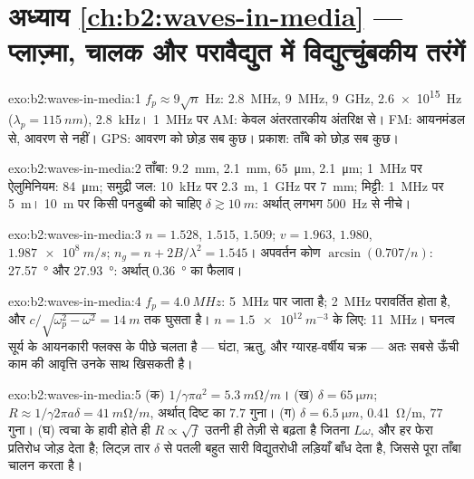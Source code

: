 \section*{अध्याय \ref{ch:b2:waves-in-media} --- प्लाज़्मा, चालक और परावैद्युत में विद्युत्चुंबकीय तरंगें}

\begin{solution}{exo:b2:waves-in-media:1}
$f_p \approx 9\sqrt n$ Hz: \qty{2.8}{MHz}, \qty{9}{MHz}, \qty{9}{GHz}, \qty{2.6e15}{Hz}
($\lambda_p = \qty{115}{nm}$), \qty{2.8}{kHz}। \qty{1}{MHz} पर AM: केवल
अंतरतारकीय अंतरिक्ष से। FM: आयनमंडल से, आवरण से नहीं। GPS:
आवरण को छोड़ सब कुछ। प्रकाश: ताँबे को छोड़ सब कुछ।
\end{solution}

\begin{solution}{exo:b2:waves-in-media:2}
ताँबा: \qty{9.2}{mm}, \qty{2.1}{mm}, \qty{65}{\micro m}, \qty{2.1}{\micro m}; \qty{1}{MHz} पर
ऐलुमिनियम: \qty{84}{\micro m}; समुद्री जल: \qty{10}{kHz} पर \qty{2.3}{m}, \qty{1}{GHz} पर
\qty{7}{mm}; मिट्टी: \qty{1}{MHz} पर \qty{5}{m}। \qty{10}{m} पर किसी पनडुब्बी को चाहिए $\delta
\gtrsim \qty{10}{m}$: अर्थात् लगभग \qty{500}{Hz} से नीचे।
\end{solution}

\begin{solution}{exo:b2:waves-in-media:3}
$n = 1.528$, $1.515$, $1.509$; $v = 1.963$, $1.980$, $\qty{1.987e8}{m/s}$; $n_g = n +
2B/\lambda^2 = 1.545$। अपवर्तन कोण $\arcsin(0.707/n)$: \qty{27.57}{\degree} और
\qty{27.93}{\degree}: अर्थात् \qty{0.36}{\degree} का फैलाव।
\end{solution}

\begin{solution}{exo:b2:waves-in-media:4}
$f_p = \qty{4.0}{MHz}$: \qty{5}{MHz} पार जाता है; \qty{2}{MHz} परावर्तित होता है, और
$c/\sqrt{\omega_p^2 - \omega^2} = \qty{14}{m}$ तक घुसता है। $n = \qty{1.5e12}{m^{-3}}$ के लिए: \qty{11}{MHz}।
घनत्व सूर्य के आयनकारी फ्लक्स के पीछे चलता है --- घंटा, ऋतु, और
ग्यारह-वर्षीय चक्र --- अतः सबसे ऊँची काम की आवृत्ति उनके साथ खिसकती है।
\end{solution}

\begin{solution}{exo:b2:waves-in-media:5}
(क) $1/\gamma\pi a^2 = \qty{5.3}{m\ohm/m}$। (ख) $\delta = \qty{65}{\micro m}$; $R \approx 1/\gamma2\pi a\delta
= \qty{41}{m\ohm/m}$, अर्थात् दिष्ट का $7.7$ गुना। (ग) $\delta = \qty{6.5}{\micro m}$, \qty{0.41}{\ohm/m},
$77$ गुना। (घ) त्वचा के हावी होते ही $R \propto \sqrt f$ उतनी ही तेज़ी से बढ़ता है
जितना $L\omega$, और हर फेरा प्रतिरोध जोड़ देता है; लिट्ज़ तार $\delta$ से पतली बहुत
सारी विद्युतरोधी लड़ियाँ बाँध देता है, जिससे पूरा ताँबा चालन करता है।
\end{solution}

